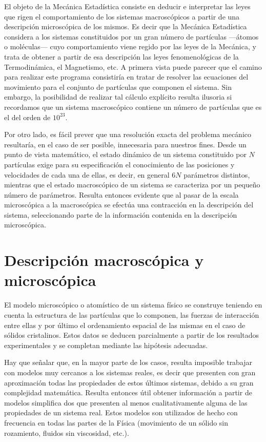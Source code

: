 El objeto de la Mecánica Estadística consiste en deducir e interpretar las leyes que rigen el comportamiento de los sistemas macroscópicos a partir de una descripción microscópica de los mismos. Es decir que la Mecánica Estadística considera a los sistemas constituidos por un gran número de partículas ---átomos o moléculas--- cuyo comportamiento viene regido por las leyes de la Mecánica, y trata de obtener a partir de esa descripción las leyes fenomenológicas de la Termodinámica, el Magnetismo, etc.
A primera vista puede parecer que el camino para realizar este programa consistiría en tratar de resolver las ecuaciones del movimiento para el conjunto de partículas que componen el sistema. Sin embargo, la posibilidad de realizar tal cálculo explícito resulta ilusoria si recordamos que un sistema macroscópico contiene un número de partículas que es el del orden de $10^{23}$.

Por otro lado, es fácil prever que una resolución exacta del problema mecánico resultaría, en el caso de ser posible, innecesaria para nuestros fines.
Desde un punto de vista matemático, el estado dinámico de un sistema constituido por $N$ partículas exige para su especificación el conocimiento de las posiciones y velocidades de cada una de ellas, es decir, en general $6N$ parámetros distintos, mientras que el estado macroscópico de un sistema se caracteriza por un pequeño número de parámetros.
Resulta entonces evidente que al pasar de la escala microscópica a la macroscópica se efectúa una contracción en la descripción del sistema, seleccionando parte de la información contenida en la descripción microscópica.

\newpage
\section{Descripción macroscópica y microscópica}

El modelo microscópico o atomístico de un sistema físico se construye teniendo en cuenta la estructura de las partículas que lo componen, las fuerzas de interacción entre ellas y por último el ordenamiento espacial de las mismas en el caso de sólidos cristalinos.
Estos datos se deducen parcialmente a partir de los resultados experimentales y se completan mediante las hipótesis adecuadas.

Hay que señalar que, en la mayor parte de los casos, resulta imposible trabajar con modelos muy cercanos a los sistemas reales, es decir que presenten con gran aproximación todas las propiedades de estos últimos sistemas, debido a su gran complejidad matemática.
Resulta entonces útil obtener información a partir de modelos simplifica dos que presenten al menos cualitativamente alguna de las propiedades de un sistema real.
Estos modelos son utilizados de hecho con frecuencia en todas las partes de la
Física (movimiento de un sólido sin rozamiento, fluidos sin viscosidad, etc.).


